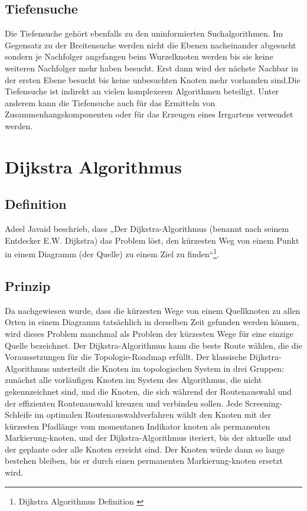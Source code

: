 \subsection{Tiefensuche}
Die Tiefensuche gehört ebenfalls zu den uninformierten Suchalgorithmen.
Im Gegensatz zu der Breitensuche werden nicht die Ebenen nacheinander abgesucht sondern je Nachfolger angefangen 
beim Wurzelknoten werden bis sie keine weiteren Nachfolger mehr haben besucht. Erst dann wird der nächste Nachbar 
in der ersten Ebene besucht bis keine unbesuchten Knoten mehr vorhanden sind.Die Tiefensuche ist indirekt an vielen 
komplexeren Algorithmen beteiligt. Unter anderem kann die Tiefensuche auch für das Ermitteln von Zusammenhangskomponenten
oder für das Erzeugen eines Irrgartens verwendet werden.
\cite{Russell:10c}


\section{Dijkstra Algorithmus}
\label{Dijkstra Algorithmus}
\subsection{Definition}

Adeel Javaid beschrieb, dass „Der Dijkstra-Algorithmus (benannt nach seinem Entdecker E.W. Dijkstra) das Problem löst, den kürzesten Weg von einem Punkt in einem Diagramm (der Quelle) zu einem Ziel zu finden“\footnote{Dijkstra Algorithmus Definition \cite{Javaid2019}}.

\subsection{Prinzip}

Da nachgewiesen wurde, dass die kürzesten Wege von einem Quellknoten zu allen Orten in einem Diagramm tatsächlich in derselben Zeit gefunden werden können, wird dieses Problem manchmal als Problem der kürzesten Wege für eine einzige Quelle bezeichnet\cite{Javaid2019}.
\newline
\newline
Der Dijkstra-Algorithmus kann die beste Route wählen, die die Voraussetzungen für die Topologie-Roadmap erfüllt. Der klassische Dijkstra-Algorithmus unterteilt die Knoten im topologischen System in drei Gruppen: zunächst alle vorläufigen Knoten im System des Algorithmus, die nicht gekennzeichnet sind, und die Knoten, die sich während der Routenauswahl und der effizienten Routenauswahl kreuzen und verbinden sollen. Jede Screening-Schleife im optimalen Routenauswahlverfahren wählt den Knoten mit der kürzesten Pfadlänge vom momentanen Indikator knoten als permanenten Markierung-knoten, und der Dijkstra-Algorithmus iteriert, bis der aktuelle und der geplante oder alle Knoten erreicht sind. Der Knoten würde dann so lange bestehen bleiben, bis er durch einen permanenten Markierung-knoten ersetzt wird\cite{Zhou2013}.

